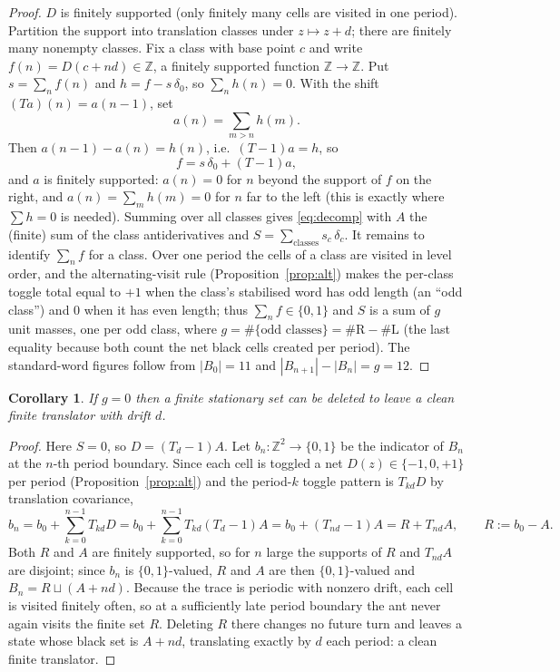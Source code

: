 \documentclass[11pt,letterpaper]{article}
\theoremstyle{plain}
\newtheorem{corollary}[theorem]{Corollary}
\theoremstyle{definition}
\newcommand{\Z}{\mathbb{Z}}
\newcommand{\drift}{d}
\newcommand{\growth}{g}
\newcommand{\turnR}{\mathrm{R}}
\newcommand{\turnL}{\mathrm{L}}
\begin{document}
\begin{NoHyper}
\begin{proof}
$D$ is finitely supported (only finitely many cells are visited in one period).
Partition the support into translation classes under $z\mapsto z+\drift$; there are
finitely many nonempty classes. Fix a class with base point $c$ and write
$f(n)=D(c+n\drift)\in\Z$, a finitely supported function $\Z\to\Z$. Put $s=\sum_n f(n)$
and $h=f-s\,\delta_0$, so $\sum_n h(n)=0$. With the shift $(Ta)(n)=a(n-1)$, set
\[
a(n)=\sum_{m>n}h(m).
\]
Then $a(n-1)-a(n)=h(n)$, i.e.\ $(T-1)a=h$, so
\[
f=s\,\delta_0+(T-1)a,
\]
and $a$ is finitely supported: $a(n)=0$ for $n$ beyond the support of $f$ on the
right, and $a(n)=\sum_m h(m)=0$ for $n$ far to the left (this is exactly where
$\sum h=0$ is needed). Summing over all classes gives \eqref{eq:decomp} with $A$ the
(finite) sum of the class antiderivatives and $S=\sum_{\text{classes}}s_c\,\delta_{c}$. It remains to
identify $\sum_n f$ for a class. Over one period the cells of a class are visited in
level order, and the alternating-visit rule (Proposition~\ref{prop:alt}) makes the
per-class toggle total equal to $+1$ when the class's stabilised word has odd length
(an ``odd class'') and $0$ when it has even length; thus $\sum_n f\in\{0,1\}$ and
$S$ is a sum of $\growth$ unit masses, one per odd class, where
$\growth=\#\{\text{odd classes}\}=\#\turnR-\#\turnL$ (the last equality because both
count the net black cells created per period). The standard-word figures follow from
$|B_0|=11$ and $|B_{n+1}|-|B_n|=\growth=12$.
\end{proof}

\begin{corollary}\label{cor:sep}
If $\growth=0$ then a finite stationary set can be deleted to leave a clean finite
translator with drift $\drift$.
\end{corollary}

\begin{proof}
Here $S=0$, so $D=(T_\drift-1)A$. Let $b_n:\Z^2\to\{0,1\}$ be the indicator of $B_n$
at the $n$-th period boundary. Since each cell is toggled a net $D(z)\in\{-1,0,+1\}$
per period (Proposition~\ref{prop:alt}) and the period-$k$ toggle pattern is
$T_{k\drift}D$ by translation covariance,
\[
b_n=b_0+\sum_{k=0}^{n-1}T_{k\drift}D
   =b_0+\sum_{k=0}^{n-1}T_{k\drift}(T_\drift-1)A
   =b_0+(T_{n\drift}-1)A=R+T_{n\drift}A,\qquad R:=b_0-A .
\]
Both $R$ and $A$ are finitely supported, so for $n$ large the supports of $R$ and
$T_{n\drift}A$ are disjoint; since $b_n$ is $\{0,1\}$-valued, $R$ and $A$ are then
$\{0,1\}$-valued and $B_n=R\sqcup(A+n\drift)$. Because the trace is periodic with
nonzero drift, each cell is visited finitely often, so at a sufficiently late period
boundary the ant never again visits the finite set $R$. Deleting $R$ there changes no
future turn and leaves a state whose black set is $A+n\drift$, translating exactly by
$\drift$ each period: a clean finite translator.
\end{proof}


\end{NoHyper}
\end{document}

